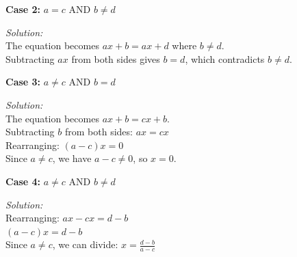 \documentclass[12pt]{article}
\begin{document}

                \vspace{0.5cm}

                \textbf{Case 2:} $a = c$ AND $b \neq d$

                \textit{Solution:}\\
                The equation becomes $ax + b = ax + d$ where $b \neq d$.\\
                Subtracting $ax$ from both sides gives $b = d$, which contradicts $b \neq d$.


                \vspace{0.5cm}

                \textbf{Case 3:} $a \neq c$ AND $b = d$

                \textit{Solution:}\\
                The equation becomes $ax + b = cx + b$.\\
                Subtracting $b$ from both sides: $ax = cx$\\
                Rearranging: $(a - c)x = 0$\\
                Since $a \neq c$, we have $a - c \neq 0$, so $x = 0$.


                \vspace{0.5cm}

                \textbf{Case 4:} $a \neq c$ AND $b \neq d$

                \textit{Solution:}\\
                Rearranging: $ax - cx = d - b$\\
                $(a - c)x = d - b$\\
                Since $a \neq c$, we can divide: $x = \frac{d - b}{a - c}$

\end{document}
